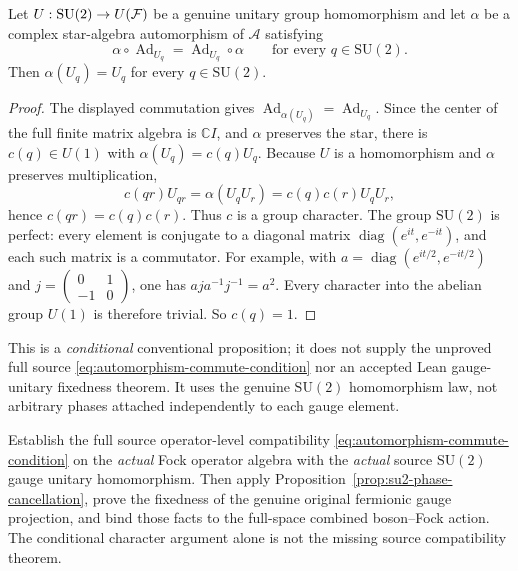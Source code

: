 \begin{proposition}\label{prop:su2-phase-cancellation}
Let $U:\mathrm{SU}(2)\to U(\mathcal F)$ be a genuine unitary
group homomorphism and let $\alpha$ be a complex star-algebra
automorphism of $\mathscr A$ satisfying
\[
 \alpha\circ\operatorname{Ad}_{U_q}
 =\operatorname{Ad}_{U_q}\circ\alpha
 \qquad\text{for every }q\in\mathrm{SU}(2).
\]
Then $\alpha(U_q)=U_q$ for every $q\in\mathrm{SU}(2)$.
\end{proposition}
\begin{proof}
The displayed commutation gives
$\operatorname{Ad}_{\alpha(U_q)}
=\operatorname{Ad}_{U_q}$. Since the center of the full
finite matrix algebra is $\mathbb C I$, and $\alpha$
preserves the star, there is $c(q)\in U(1)$ with
$\alpha(U_q)=c(q)U_q$. Because $U$ is a homomorphism and
$\alpha$ preserves multiplication,
\[
 c(qr)U_{qr}=\alpha(U_qU_r)
 =c(q)c(r)U_qU_r,
\]
hence $c(qr)=c(q)c(r)$. Thus $c$ is a group character.
The group $\mathrm{SU}(2)$ is perfect: every element is
conjugate to a diagonal matrix
$\operatorname{diag}(e^{it},e^{-it})$, and each such matrix
is a commutator. For example, with
$a=\operatorname{diag}(e^{it/2},e^{-it/2})$ and
$j=\left(\begin{smallmatrix}0&1\\-1&0\end{smallmatrix}\right)$,
one has $aja^{-1}j^{-1}=a^2$. Every character into
the abelian group $U(1)$ is therefore trivial.
So $c(q)=1$.
\end{proof}
This is a \emph{conditional} conventional proposition; it does
not supply the unproved full source
\eqref{eq:automorphism-commute-condition} nor an accepted
Lean gauge-unitary fixedness theorem. It uses the genuine
$\mathrm{SU}(2)$ homomorphism law, not arbitrary phases
attached independently to each gauge element.

\begin{openproblem}
Establish the full source operator-level compatibility
\eqref{eq:automorphism-commute-condition} on the \emph{actual}
Fock operator algebra with the \emph{actual} source
$\mathrm{SU}(2)$ gauge unitary homomorphism. Then apply
Proposition~\ref{prop:su2-phase-cancellation}, prove the fixedness
of the genuine original fermionic gauge projection, and bind those
facts to the full-space combined boson--Fock action. The conditional
character argument alone is not the missing source compatibility theorem.
\end{openproblem}

